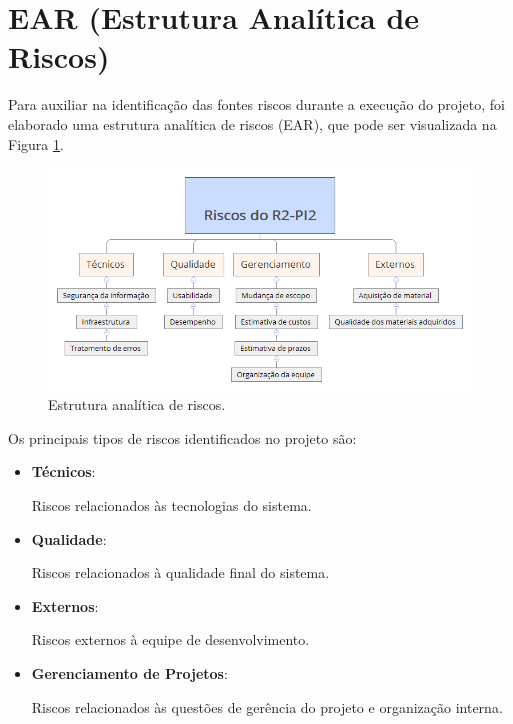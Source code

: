 \section{EAR (Estrutura Analítica de Riscos)} %
\label{sec:ear_estrutura_analítica_de_riscos_}

	Para auxiliar na identificação das fontes riscos durante a execução do projeto, foi elaborado uma estrutura analítica de riscos (EAR), que pode ser visualizada na Figura \ref{img:ear}.

	\begin{figure}[H]
		\centering
		\includegraphics[scale=0.55]{figuras/ear.png}
		\caption{Estrutura analítica de riscos.}
		\label{img:ear}
	\end{figure}

	Os principais tipos de riscos identificados no projeto são:

	\begin{itemize}
		\item \textbf{Técnicos}: 
			
			Riscos relacionados às tecnologias do sistema.

		\item \textbf{Qualidade}: 
			
			Riscos relacionados à qualidade final do sistema.

		\item \textbf{Externos}:

			Riscos externos à equipe de desenvolvimento.

		\item \textbf{Gerenciamento de Projetos}:

			Riscos relacionados às questões de gerência do projeto e organização interna.
	
	\end{itemize}

